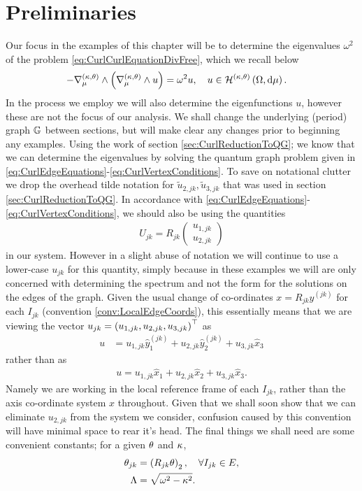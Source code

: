 \section{Preliminaries} \label{sec:ExamplePrelims}
Our focus in the examples of this chapter will be to determine the eigenvalues $\omega^2$ of the problem \eqref{eq:CurlCurlEquationDivFree}, which we recall below
\begin{align*}
	-\nabla_{\mu}^{\left( \kappa, \theta \right)}\wedge\left( \nabla_{\mu}^{\left( \kappa, \theta \right)}\wedge u \right) &= \omega^2 u, \quad u\in\mathcal{H}^{\left( \kappa, \theta \right)}\left( \Omega, \mathrm{d}\mu \right).
\end{align*}
In the process we employ we will also determine the eigenfunctions $u$, however these are not the focus of our analysis.
We shall change the underlying (period) graph $\mathbb{G}$ between sections, but will make clear any changes prior to beginning any examples.
Using the work of section \ref{sec:CurlReductionToQG}; we know that we can determine the eigenvalues by solving the quantum graph problem given in \eqref{eq:CurlEdgeEquations}-\eqref{eq:CurlVertexConditions}.
To save on notational clutter we drop the overhead tilde notation for $\widetilde{u}_{2,jk},\widetilde{u}_{3,jk}$ that was used in section \ref{sec:CurlReductionToQG}.
In accordance with \eqref{eq:CurlEdgeEquations}-\eqref{eq:CurlVertexConditions}, we should also be using the quantities 
\begin{align*}
	U_{jk} = R_{jk}\begin{pmatrix} u_{1,jk} \\ u_{2,jk} \end{pmatrix}
\end{align*}
in our system.
However in a slight abuse of notation we will continue to use a lower-case $u_{jk}$ for this quantity, simply because in these examples we will are only concerned with determining the spectrum and not the form for the solutions on the edges of the graph. 
Given the usual change of co-ordinates $x=R_{jk}y^{(jk)}$ for each $I_{jk}$ (convention \ref{conv:LocalEdgeCoords}), this essentially means that we are viewing the vector $u_{jk}=\left( u_{1,jk},u_{2,jk},u_{3,jk} \right)^\top$ as 
\begin{align*}
	u &= u_{1,jk}\hat{y}^{(jk)}_1 + u_{2,jk}\hat{y}^{(jk)}_2 + u_{3,jk}\hat{x}_3
\end{align*}
rather than as 
\begin{align*}
u = u_{1,jk}\hat{x}_1 + u_{2,jk}\hat{x}_2 + u_{3,jk}\hat{x}_3.
\end{align*}
Namely we are working in the local reference frame of each $I_{jk}$, rather than the axis co-ordinate system $x$ throughout. 
Given that we shall soon show that we can eliminate $u_{2,jk}$ from the system we consider, confusion caused by this convention will have minimal space to rear it's head.
The final things we shall need are some convenient constants; for a given $\theta$ and $\kappa$,
\begin{align*}
	\theta_{jk} &= \left( R_{jk}\theta \right)_2, \quad\forall I_{jk}\in E,\\
	\Lambda &= \sqrt{\omega^2 - \kappa^2}.
\end{align*}

